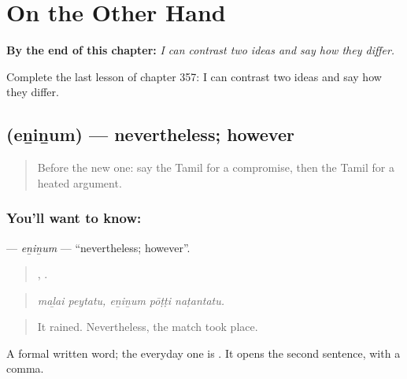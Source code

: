 
\chapter{On the Other Hand}
\label{ch:ta-on-the-other-hand}

\begin{chapteropening}
\textbf{By the end of this chapter:} \emph{I can contrast two ideas and say how they differ.}

Complete the last lesson of chapter 357: I can contrast two ideas and say how they differ.
\end{chapteropening}

\section[\texorpdfstring{\ta{எனினும்} (eṉiṉum)}{எனினும் (eṉiṉum)}]{ (eṉiṉum) — nevertheless; however}

\label{lesson:TA-C357-eninum}



\begin{quote}
Before the new one: say the Tamil for a compromise, then the Tamil for a heated argument.
\end{quote}

\subsection*{You'll want to know: }
\textbf{} — \emph{eṉiṉum} — \textquotedblleft{}nevertheless; however\textquotedblright{}.

\begin{quote}
 ,   .
\end{quote}

\begin{quote}
\emph{maḻai peytatu, eṉiṉum pōṭṭi naṭantatu.}
\end{quote}

\begin{quote}
It rained. Nevertheless, the match took place.
\end{quote}

A formal written word; the everyday one is . It opens the second sentence, with a comma.

